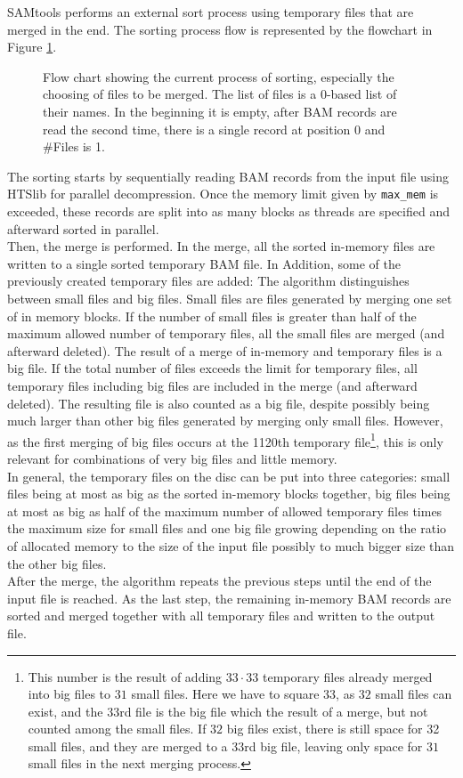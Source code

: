 SAMtools performs an external sort process using temporary files that are merged in the end. The sorting process flow is represented by the flowchart in Figure \ref{fig:flow}.
\begin{figure}[ht]
    \begin{adjustbox}{width=\linewidth}
        
    \end{adjustbox}
    \caption{Flow chart showing the current process of sorting, especially the choosing of files to be merged. The list of files is a 0-based list of their names. In the beginning it is empty, after BAM records are read the second time, there is a single record at position 0 and \#Files is 1.}
    \label{fig:flow}
\end{figure}
The sorting starts by sequentially reading BAM records from the input file using HTSlib for parallel decompression. Once the memory limit given by \texttt{max\_mem} is exceeded, these records are split into as many blocks as threads are specified and afterward sorted in parallel. \\
Then, the merge is performed. In the merge, all the sorted in-memory files are written to a single sorted temporary BAM file. In Addition, some of the previously created temporary files are added: The algorithm distinguishes between small files and big files. Small files are files generated by merging one set of in memory blocks. If the number of small files is greater than half of the maximum allowed number of temporary files, all the small files are merged (and afterward deleted). The result of a merge of in-memory and temporary files is a big file. If the total number of files exceeds the limit for temporary files, all temporary files including big files are included in the merge (and afterward deleted). The resulting file is also counted as a big file, despite possibly being much larger than other big files generated by merging only small files. However, as the first merging of big files occurs at the 1120th temporary file\footnote{This number is the result of adding $33 \cdot 33$ temporary files already merged into big files to $31$ small files. Here we have to square $33$, as $32$ small files can exist, and the $33$rd file is the big file which the result of a merge, but not counted among the small files. If $32$ big files exist, there is still space for 32 small files, and they are merged to a $33$rd big file, leaving only space for $31$ small files in the next merging process.}, this is only relevant for combinations of very big files and little memory. \\
In general, the temporary files on the disc can be put into three categories: small files being at most as big as the sorted in-memory blocks together, big files being at most as big as half of the maximum number of allowed temporary files times the maximum size for small files and one big file growing depending on the ratio of allocated memory to the size of the input file possibly to much bigger size than the other big files. \\
After the merge, the algorithm repeats the previous steps until the end of the input file is reached. As the last step, the remaining in-memory BAM records are sorted and merged together with all temporary files and written to the output file.